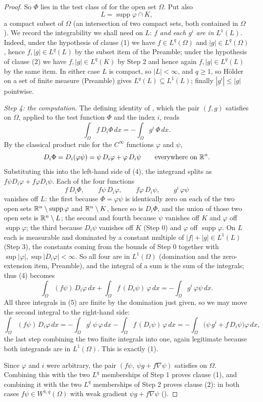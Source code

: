 \begin{proof}
So $\Phi$ lies in the test class of  for the open set
$\Omega$.  Put also
\[
L=\operatorname{supp}\varphi\cap K ,
\]
a compact subset of $\Omega$ (an intersection of two compact sets, both
contained in $\Omega$).  We record the integrability we shall need on $L$:
\emph{$f$ and each $g^i$ are in $L^1(L)$.}  Indeed, under the hypothesis of
clause (1) we have $f\in L^q(\Omega)$ and $|g|\in L^q(\Omega)$, hence
$f,|g|\in L^q(L)$ by the subset item of the Preamble; under the hypothesis of
clause (2) we have $f,|g|\in L^q(K)$ by Step 2 and hence again $f,|g|\in L^q(L)$
by the same item.  In either case $L$ is compact, so $|L|<\infty$, and
$q\ge1$, so H\"older on a set of finite measure (Preamble) gives
$L^q(L)\subseteq L^1(L)$; finally $|g^i|\le|g|$ pointwise.

\emph{Step 4: the computation.}  The defining identity of
, which the pair $(f,g)$ satisfies on $\Omega$,
applied to the test function $\Phi$ and the index $i$, reads
\[
\int_\Omega f\,D_i\Phi\,dx=-\int_\Omega g^i\,\Phi\,dx .
\tag{4}
\]
By the classical product rule for the $C^\infty$ functions $\varphi$ and $\psi$,
\[
D_i\Phi=D_i(\varphi\psi)=\psi\,D_i\varphi+\varphi\,D_i\psi
\qquad\text{everywhere on }\mathbb{R}^n .
\]
Substituting this into the left-hand side of (4), the integrand splits as
$f\psi D_i\varphi+f\varphi D_i\psi$.  Each of the four functions
\[
f\,D_i\Phi,\qquad f\psi\,D_i\varphi,\qquad f\varphi\,D_i\psi,\qquad
g^i\,\varphi\psi
\]
vanishes off $L$: the first because $\Phi=\varphi\psi$ is identically zero on
each of the two open sets $\mathbb{R}^n\setminus\operatorname{supp}\varphi$ and
$\mathbb{R}^n\setminus K$, hence so is $D_i\Phi$, and the union of those two open sets
is $\mathbb{R}^n\setminus L$; the second and fourth because $\psi$ vanishes off $K$ and
$\varphi$ off $\operatorname{supp}\varphi$; the third because $D_i\psi$
vanishes off $K$ (Step 0) and $\varphi$ off $\operatorname{supp}\varphi$.  On $L$ each is measurable and
dominated by a constant multiple of $|f|+|g|\in L^1(L)$ (Step 3), the constants
coming from the bounds of Step 0 together with
$\sup|\varphi|,\sup|D_i\varphi|<\infty$.  So all four are in $L^1(\Omega)$
(domination and the zero-extension item, Preamble), and the integral of a sum
is the sum of the integrals; thus (4) becomes
\[
\int_\Omega (f\psi)\,D_i\varphi\,dx+\int_\Omega f\,(D_i\psi)\,\varphi\,dx
=-\int_\Omega g^i\,\varphi\psi\,dx .
\tag{5}
\]
All three integrals in (5) are finite by the domination just given, so we may
move the second integral to the right-hand side:
\[
\int_\Omega (f\psi)\,D_i\varphi\,dx
=-\int_\Omega g^i\,\psi\,\varphi\,dx-\int_\Omega f\,(D_i\psi)\,\varphi\,dx
=-\int_\Omega\bigl(\psi\,g^i+f\,D_i\psi\bigr)\varphi\,dx ,
\]
the last step combining the two finite integrals into one, again legitimate
because both integrands are in $L^1(\Omega)$.  This is exactly (1).

Since $\varphi$ and $i$ were arbitrary, the pair
$(f\psi,\ \psi g+f\nabla\psi)$ satisfies  on
$\Omega$.  Combining this with the two $L^q$ memberships of Step 1 proves
clause (1), and combining it with the two $L^q$ memberships of Step 2 proves
clause (2): in both cases $f\psi\in W^{1,q}(\Omega)$ with weak gradient
$\psi g+f\nabla\psi$ ().
\end{proof}
